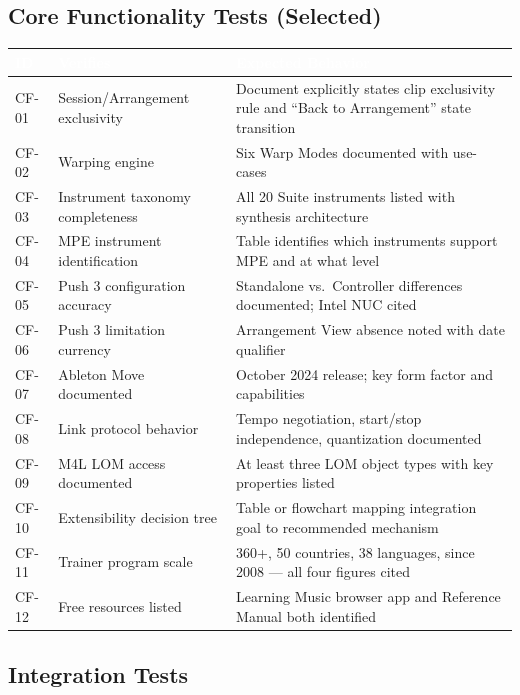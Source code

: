 \documentclass[11pt,letterpaper]{article}
\newcommand{\tableheader}[1]{\textbf{\sffamily\textcolor{white}{#1}}}
\begin{document}
\subsection{Core Functionality Tests (Selected)}

\begin{center}
\begin{tabularx}{\textwidth}{C{1.5cm}L{4cm}X}
\toprule
{}
\tableheader{ID} & \tableheader{Verifies} & \tableheader{Expected Behavior} \\
\midrule
CF-01 & Session/Arrangement exclusivity & Document explicitly states clip exclusivity rule and ``Back to Arrangement'' state transition \\
CF-02 & Warping engine & Six Warp Modes documented with use-cases \\
CF-03 & Instrument taxonomy completeness & All 20 Suite instruments listed with synthesis architecture \\
CF-04 & MPE instrument identification & Table identifies which instruments support MPE and at what level \\
CF-05 & Push 3 configuration accuracy & Standalone vs.\ Controller differences documented; Intel NUC cited \\
CF-06 & Push 3 limitation currency & Arrangement View absence noted with date qualifier \\
CF-07 & Ableton Move documented & October 2024 release; key form factor and capabilities \\
CF-08 & Link protocol behavior & Tempo negotiation, start/stop independence, quantization documented \\
CF-09 & M4L LOM access documented & At least three LOM object types with key properties listed \\
CF-10 & Extensibility decision tree & Table or flowchart mapping integration goal to recommended mechanism \\
CF-11 & Trainer program scale & 360+, 50 countries, 38 languages, since 2008 --- all four figures cited \\
CF-12 & Free resources listed & Learning Music browser app and Reference Manual both identified \\
\bottomrule
\end{tabularx}
\end{center}

\subsection{Integration Tests}
\end{document}
